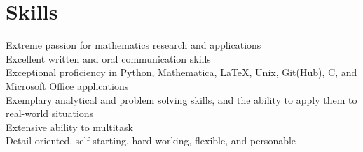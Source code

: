 \documentclass[letterpaper]{deedy-resume} %
\begin{document}
\begin{minipage}[t]{0.33\textwidth}
\section{Skills}
\textbullet{} Extreme passion for mathematics research and applications\\
\textbullet{} Excellent written and oral communication skills\\
\textbullet{} Exceptional proficiency in Python, Mathematica, \LaTeX, Unix, Git(Hub), C, and Microsoft Office applications\\
\textbullet{} Exemplary analytical and problem solving skills, and the ability to apply them to real-world situations\\
\textbullet{} Extensive ability to multitask\\
\textbullet{} Detail oriented, self starting, hard working, flexible, and personable



\end{minipage} %
\hfill
%
%
\end{document}
